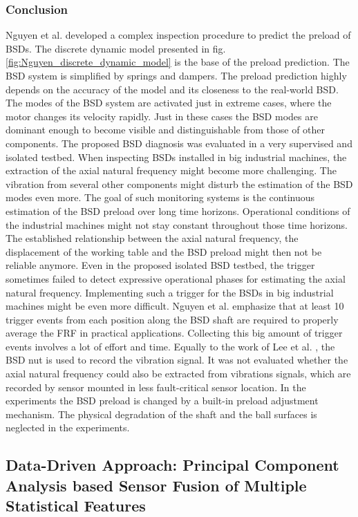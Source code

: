 \subsubsection{Conclusion}
Nguyen et al. \cite{NGUYEN2019} developed a complex inspection procedure to predict the preload of BSDs. The discrete dynamic model presented in fig. \ref{fig:Nguyen_discrete_dynamic_model} is the base of the preload prediction. The BSD system is simplified by springs and dampers. The preload prediction highly depends on the accuracy of the model and its closeness to the real-world BSD. The modes of the BSD system are activated just in extreme cases, where the motor changes its velocity rapidly. Just in these cases the BSD modes are dominant enough to become visible and distinguishable from those of other components. The proposed BSD diagnosis was evaluated in a very supervised and isolated testbed. When inspecting BSDs installed in big industrial machines, the extraction of the axial natural frequency might become more challenging. The vibration from several other components might disturb the estimation of the BSD modes even more. The goal of such monitoring systems is the continuous estimation of the BSD preload over long time horizons. Operational conditions of the industrial machines might not stay constant throughout those time horizons. The established relationship between the axial natural frequency, the displacement of the working table and the BSD preload might then not be reliable anymore. Even in the proposed isolated BSD testbed, the trigger sometimes failed to detect expressive operational phases for estimating the axial natural frequency. Implementing such a trigger for the BSDs in big industrial machines might be even more difficult. Nguyen et al. \cite{NGUYEN2019} emphasize that at least 10 trigger events from each position along the BSD shaft are required to properly average the FRF in practical applications. Collecting this big amount of trigger events involves a lot of effort and time. Equally to the work of Lee et al. \cite{Lee2015}, the BSD nut is used to record the vibration signal. It was not evaluated whether the axial natural frequency could also be extracted from vibrations signals, which are recorded by sensor mounted in less fault-critical sensor location. In the experiments the BSD preload is changed by a built-in preload adjustment mechanism. The physical degradation of the shaft and the ball surfaces is neglected in the experiments.

\subsection{Data-Driven Approach: Principal Component Analysis based Sensor Fusion of Multiple Statistical Features}

